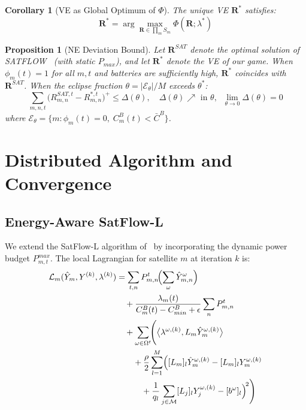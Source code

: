 \documentclass[journal]{IEEEtran}
\newtheorem{proposition}{Proposition}
\newtheorem{corollary}{Corollary}
\newcommand{\CB}{C^{B}}
\newcommand{\CBmin}{C^{B}_{min}}
\newcommand{\Pmax}{P_{max}}
\newcommand{\calM}{\mathcal{M}}
\newcommand{\bfR}{\mathbf{R}}
\begin{document}
\begin{corollary}[VE as Global Optimum of $\Phi$]
\label{cor:ne_optimal}
The unique VE $\bfR^*$ satisfies:
\begin{equation}
    \bfR^* = \arg\max_{\bfR\in\prod_m S_m}
    \Phi(\bfR;\lambda^*)
\end{equation}
\end{corollary}

\begin{proposition}[NE Deviation Bound]
\label{prop:deviation}
Let $\bfR^{SAT}$ denote the optimal solution of SATFLOW~\cite{cen2024satflow} (with static $\Pmax$), and let $\bfR^*$ denote the VE of our game. When $\phi_m(t)=1$ for all $m,t$ and batteries are sufficiently high, $\bfR^*$ coincides with $\bfR^{SAT}$. When the eclipse fraction $\theta = |\mathcal{E}_\theta|/M$ exceeds $\theta^*$:
\begin{equation}
    \sum_{m,n,t}\!\bigl(
    R_{m,n}^{SAT,t} - R_{m,n}^{*,t}
    \bigr)^+
    \leq \Delta(\theta),
    \quad
    \Delta(\theta)\nearrow \text{ in }\theta,
    \;\;
    \lim_{\theta\to 0}\Delta(\theta)=0
    \label{eq:deviation_bound}
\end{equation}
where $\mathcal{E}_\theta = \{m : \phi_m(t)=0,\;\CB_m(t)<\bar{C}^B\}$.
\end{proposition}


\section{Distributed Algorithm and Convergence}
\label{sec:algorithm}

\subsection{Energy-Aware SatFlow-L}

We extend the SatFlow-L algorithm of~\cite{cen2024satflow} by incorporating the dynamic power budget $P_{m,t}^{max}$. The local Lagrangian for satellite $m$ at iteration $k$ is:
\begin{align}
    \mathcal{L}_m(\hat{Y}_m,Y^{(k)},\lambda^{(k)})
    &= \sum_{t,n} P_{m,n}^t\!\Bigl(\sum_{\omega}
    \hat{Y}_{m,n}^{\omega}\Bigr)
    \notag\\
    &\quad+
    \frac{\lambda_m(t)}{\CB_m(t)-\CBmin+\epsilon}
    \sum_{n} P_{m,n}^t
    \notag\\
    &\quad+
    \sum_{\omega\in\Omega^t}\!\Biggl(
    \bigl\langle
    \lambda^{\omega,(k)},
    L_m\hat{Y}_m^{\omega,(k)}
    \bigr\rangle
    \notag\\
    &\qquad+
    \frac{\rho}{2}\sum_{l=1}^{M}
    \Bigl(
    [L_m]_l\hat{Y}_m^{\omega,(k)}
    - [L_m]_l Y_m^{\omega,(k)}
    \notag\\
    &\qquad\quad+
    \frac{1}{q_l}\sum_{j\in\calM}
    [L_j]_l Y_j^{\omega,(k)}
    - [b^\omega]_l
    \Bigr)^{\!2}
    \Biggr)
    \label{eq:lagrangian_ea}
\end{align}
\end{document}
